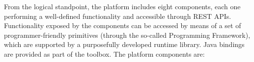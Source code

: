 

From the logical standpoint, the platform includes eight components, each one performing a well-defined functionality and accessible through REST APIs. Functionality exposed by the components can be accessed by means of a set of programmer-friendly primitives (through the so-called Programming Framework), which are supported by a purposefully developed runtime library. Java bindings are provided as part of the toolbox. 
The platform components are:


